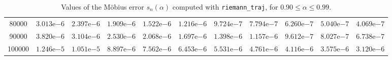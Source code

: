 \begin{table}[ht!]
{\begin{tabular}{|c|c|c|c|c|c|c|c|c|c|c|}
80000  & $3.013\mathrm{e}{-6}$ & $2.397\mathrm{e}{-6}$ & $1.909\mathrm{e}{-6}$ & $1.522\mathrm{e}{-6}$ & $1.216\mathrm{e}{-6}$ & $9.724\mathrm{e}{-7}$ & $7.794\mathrm{e}{-7}$ & $6.260\mathrm{e}{-7}$ & $5.040\mathrm{e}{-7}$ & $4.069\mathrm{e}{-7}$ \\
90000  & $3.820\mathrm{e}{-6}$ & $3.104\mathrm{e}{-6}$ & $2.530\mathrm{e}{-6}$ & $2.068\mathrm{e}{-6}$ & $1.697\mathrm{e}{-6}$ & $1.398\mathrm{e}{-6}$ & $1.157\mathrm{e}{-6}$ & $9.612\mathrm{e}{-7}$ & $8.027\mathrm{e}{-7}$ & $6.738\mathrm{e}{-7}$ \\
100000 & $1.246\mathrm{e}{-5}$ & $1.051\mathrm{e}{-5}$ & $8.897\mathrm{e}{-6}$ & $7.562\mathrm{e}{-6}$ & $6.453\mathrm{e}{-6}$ & $5.531\mathrm{e}{-6}$ & $4.761\mathrm{e}{-6}$ & $4.116\mathrm{e}{-6}$ & $3.575\mathrm{e}{-6}$ & $3.120\mathrm{e}{-6}$ \\
\hline
\end{tabular}}
\caption{Values of the M\"obius error $s_n(\alpha)$ computed with \texttt{riemann\_traj}, for $0.90 \leq \alpha \leq 0.99$.}
\label{tab:alpha09-f90}
\end{table}

